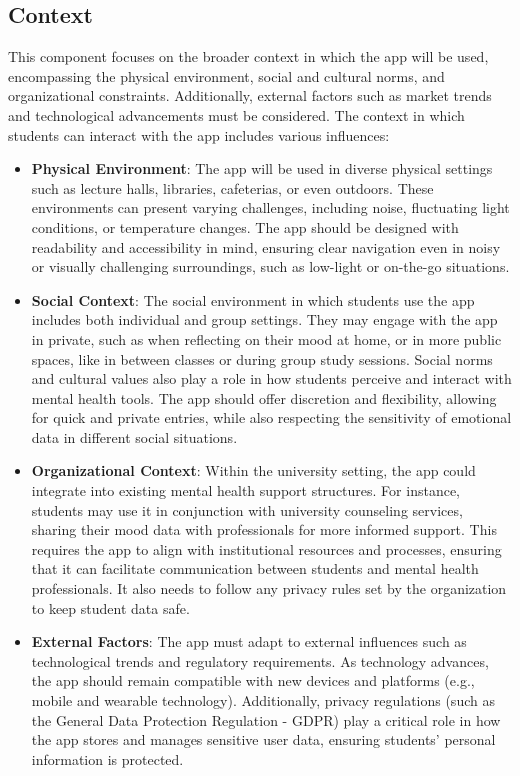 \subsection{Context}

This component focuses on the broader context in which the app will be used, encompassing the physical environment, social and cultural norms, and organizational constraints. Additionally, external factors such as market trends and technological advancements must be considered. The context in which students can interact with the app includes various influences:

\begin{itemize}
    \item \textbf{Physical Environment}: The app will be used in diverse physical settings such as lecture halls, libraries, cafeterias, or even outdoors. These environments can present varying challenges, including noise, fluctuating light conditions, or temperature changes. The app should be designed with readability and accessibility in mind, ensuring clear navigation even in noisy or visually challenging surroundings, such as low-light or on-the-go situations.
    \item \textbf{Social Context}: The social environment in which students use the app includes both individual and group settings. They may engage with the app in private, such as when reflecting on their mood at home, or in more public spaces, like in between classes or during group study sessions. Social norms and cultural values also play a role in how students perceive and interact with mental health tools. The app should offer discretion and flexibility, allowing for quick and private entries, while also respecting the sensitivity of emotional data in different social situations.
    \item \textbf{Organizational Context}: Within the university setting, the app could integrate into existing mental health support structures. For instance, students may use it in conjunction with university counseling services, sharing their mood data with professionals for more informed support. This requires the app to align with institutional resources and processes, ensuring that it can facilitate communication between students and mental health professionals. It also needs to follow any privacy rules set by the organization to keep student data safe.
    \item \textbf{External Factors}: The app must adapt to external influences such as technological trends and regulatory requirements. As technology advances, the app should remain compatible with new devices and platforms (e.g., mobile and wearable technology). Additionally, privacy regulations (such as the General Data Protection Regulation - GDPR) play a critical role in how the app stores and manages sensitive user data, ensuring students’ personal information is protected.
\end{itemize}

